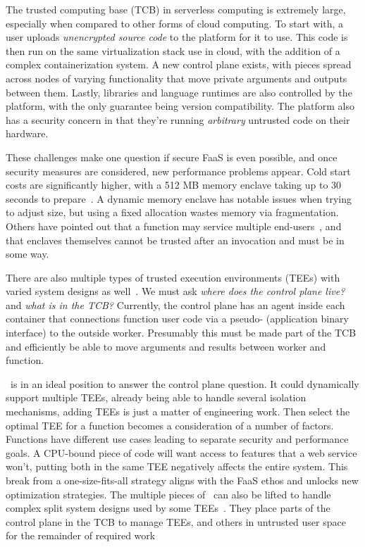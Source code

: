 The trusted computing base (TCB) in serverless computing is extremely large, especially when compared to other forms of cloud computing.
To start with, a user uploads \emph{unencrypted source code} to the platform for it to use.
This code is then run on the same virtualization stack use in cloud, with the addition of a complex containerization system.
A new control plane exists, with pieces spread across nodes of varying functionality that move private arguments and outputs between them.
Lastly, libraries and language runtimes are also controlled by the platform, with the only guarantee being version compatibility. 
The platform also has a security concern in that they're running \emph{arbitrary} untrusted code on their hardware.

These challenges make one question if secure FaaS is even possible, and once security measures are considered, new performance problems appear.
Cold start costs are significantly higher, with a 512 MB memory enclave taking up to 30 seconds to prepare~\cite{trach2019clemmys}.
A dynamic memory enclave has notable issues when trying to adjust size, but using a fixed allocation wastes memory via fragmentation.
Others have pointed out that a function may service multiple end-users~\cite{kim2023cryonics,zhao2023reusable}, and that enclaves themselves cannot be trusted after an invocation and must be  in some way.

There are also multiple types of trusted execution environments (TEEs) with varied system designs as well~\cite{arnautov2016scone,wang2022virtee,tsai2017graphene,jia2022hyperenclave}.
We must ask \emph{where does the control plane live?} and \emph{what is in the TCB?}
Currently, the control plane has an agent inside each container that connections function user code via a pseudo- (application binary interface) to the outside worker.
Presumably this must be made part of the TCB and efficiently be able to move arguments and results between worker and function.

\sysname~is in an ideal position to answer the control plane question.
It could dynamically support multiple TEEs, already being able to handle several isolation mechanisms, adding TEEs is just a matter of engineering work.
Then select the optimal TEE for a function becomes a consideration of a number of factors.
Functions have different use cases leading to separate security and performance goals.
A CPU-bound piece of code will want access to features that a web service won't, putting both in the same TEE negatively affects the entire system. 
This break from a one-size-fits-all strategy aligns with the FaaS ethos and unlocks new optimization strategies.
The multiple pieces of \sysname~can also be lifted to handle complex split system designs used by some TEEs~\cite{tsai2017graphene,jia2022hyperenclave}.
They place parts of the control plane in the TCB to manage TEEs, and others in untrusted user space for the remainder of required work

